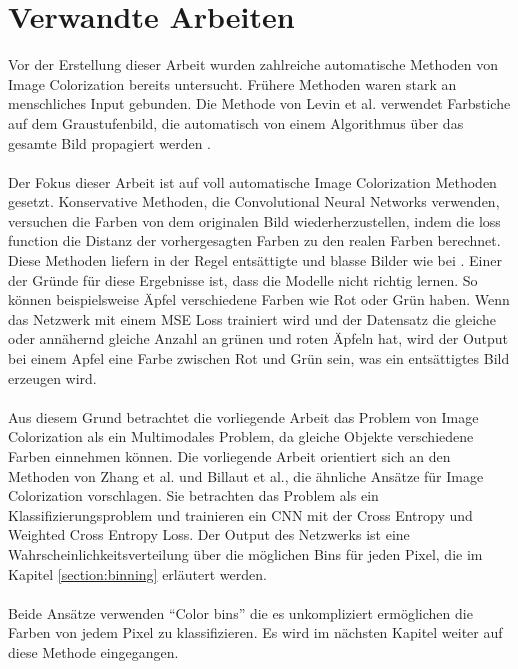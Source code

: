 \section{Verwandte Arbeiten}\label{subsection:verwandte-arbeiten}
Vor der Erstellung dieser Arbeit wurden zahlreiche automatische Methoden von Image Colorization bereits untersucht. Frühere Methoden waren
stark an menschliches Input
gebunden. Die Methode von Levin et al. verwendet Farbstiche auf dem Graustufenbild, die automatisch von einem Algorithmus über das gesamte
Bild propagiert werden \cite{10.1145/1015706.1015780}.
\\
\\
Der Fokus dieser Arbeit ist auf voll automatische Image Colorization Methoden gesetzt. Konservative Methoden, die Convolutional Neural Networks
verwenden, versuchen die Farben von dem originalen Bild wiederherzustellen, indem die \gls{loss function} die Distanz der vorhergesagten
Farben zu den realen Farben berechnet. Diese Methoden liefern in der Regel entsättigte und blasse Bilder wie bei \cite{zbulak2019image}.
Einer der Gründe für diese Ergebnisse ist, dass die Modelle nicht richtig lernen. So können beispielsweise Äpfel verschiedene Farben
wie Rot oder Grün haben. Wenn das Netzwerk mit einem MSE Loss trainiert wird und der Datensatz die gleiche oder annähernd gleiche Anzahl an
grünen und roten Äpfeln hat, wird der Output bei einem Apfel eine Farbe zwischen Rot und Grün sein, was ein entsättigtes Bild erzeugen wird.
\\
\\
Aus diesem Grund betrachtet die vorliegende Arbeit das Problem von Image Colorization als ein Multimodales Problem,
da gleiche Objekte verschiedene Farben einnehmen können.
Die vorliegende Arbeit orientiert sich an den Methoden von Zhang et al. und Billaut et al., die ähnliche Ansätze für Image Colorization vorschlagen.
Sie betrachten das Problem als ein Klassifizierungsproblem und trainieren ein CNN mit der Cross Entropy und Weighted Cross Entropy Loss.
Der Output des Netzwerks ist eine Wahrscheinlichkeitsverteilung über die möglichen Bins für jeden Pixel, die im Kapitel \ref{section:binning} erläutert werden.
\\
\\
Beide Ansätze verwenden ``Color \gls{bin}s'' die es unkompliziert ermöglichen die Farben von jedem Pixel zu klassifizieren.
Es wird im nächsten Kapitel weiter auf diese Methode eingegangen.

